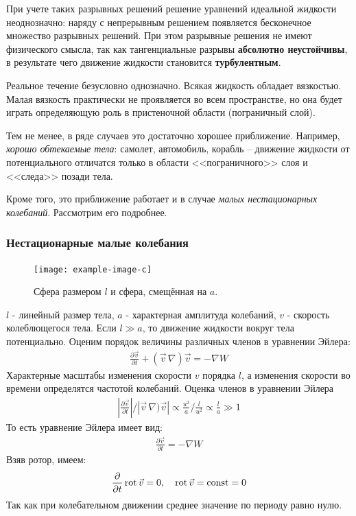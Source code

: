 При учете таких разрывных решений решение уравнений идеальной жидкости неоднозначно: наряду с непрерывным решением появляется бесконечное множество разрывных решений. При этом разрывные решения не имеют физического смысла, так как тангенциальные разрывы \textbf{абсолютно неустойчивы}, в результате чего движение жидкости становится \textbf{турбулентным}.

Реальное течение безусловно однозначно. Всякая жидкость обладает вязкостью. Малая вязкость практически не проявляется во всем пространстве, но она будет играть определяющую роль в пристеночной области (пограничный слой).

Тем не менее, в ряде случаев это достаточно хорошее приближение.  Например, \textit{хорошо обтекаемые тела}: самолет, автомобиль, корабль -- движение жидкости от потенциального отличатся только в области <<пограничного>> слоя и <<следа>> позади тела.

Кроме того, это приближение работает и в случае \textit{малых нестационарных колебаний}. Рассмотрим его подробнее.


\subsubsection{Нестационарные малые колебания}
\begin{figure}[H]
	\centering
	\texttt{[image: example-image-c]}
	\caption{Сфера размером $l$ и сфера, смещённая на $a$.}
	\label{fig:figure15}
\end{figure}
$l$ - линейный размер тела, $a$ - характерная амплитуда колебаний, $v$ - скорость колеблющегося тела. Если $l \gg a$, то движение жидкости вокруг тела потенциально. Оценим порядок величины различных членов в уравнении Эйлера:
\begin{align*}
\frac { \partial \vec{v} } { \partial t } + ( \vec{v}\,\nabla ) \vec{v} = - \nabla W
\end{align*}
Характерные масштабы изменения скорости $v$ порядка $l$, а изменения скорости во времени определятся частотой колебаний. Оценка членов в уравнении Эйлера
\begin{align*}
\left| \frac { \partial \vec{v} } { \partial t } \right| / \left| \vec{v}\,\nabla ) \vec{v} \right| \propto \frac { u ^ { 2 } } { a } / \frac { l } { u ^ { 2 } } \propto \frac { l } { a } \gg 1
\end{align*}
То есть уравнение Эйлера имеет вид:
\begin{align*}
\frac { \partial \vec{v} } { \partial t } = - \nabla W
\end{align*}
Взяв ротор, имеем:
\begin{align*}
\pdv{t}  \operatorname{rot}  \vec{v} = 0 , \quad\operatorname{rot}\vec{v} = \operatorname { const } = 0
\end{align*}
Так как при колебательном движении среднее значение по периоду равно нулю.

